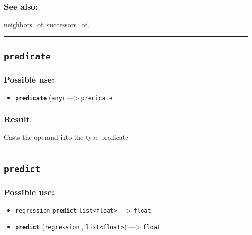 \documentclass[]{book}
\providecommand{\tightlist}{%
  \setlength{\itemsep}{0pt}\setlength{\parskip}{0pt}}
\theoremstyle{definition}
\theoremstyle{definition}
\theoremstyle{definition}
\theoremstyle{remark}
\begin{document}
\subsubsection{See also:}\label{see-also-168}

\href{operators-n-to-r.html\#neighbors_of}{neighbors\_of},
\href{operators-s-to-z.html\#successors_of}{successors\_of},

\begin{center}\rule{0.5\linewidth}{\linethickness}\end{center}

\subsection{\texorpdfstring{\texttt{predicate}}{predicate}}\label{predicate}

\subsubsection{Possible use:}\label{possible-use-416}

\begin{itemize}
\tightlist
\item
  \textbf{\texttt{predicate}} (\texttt{any}) ---\textgreater{}
  \texttt{predicate}
\end{itemize}

\subsubsection{Result:}\label{result-402}

Casts the operand into the type predicate

\begin{center}\rule{0.5\linewidth}{\linethickness}\end{center}

\subsection{\texorpdfstring{\texttt{predict}}{predict}}\label{predict}

\subsubsection{Possible use:}\label{possible-use-417}

\begin{itemize}
\tightlist
\item
  \texttt{regression} \textbf{\texttt{predict}}
  \texttt{list\textless{}float\textgreater{}} ---\textgreater{}
  \texttt{float}
\item
  \textbf{\texttt{predict}} (\texttt{regression} ,
  \texttt{list\textless{}float\textgreater{}}) ---\textgreater{}
  \texttt{float}
\end{itemize}
\end{document}

